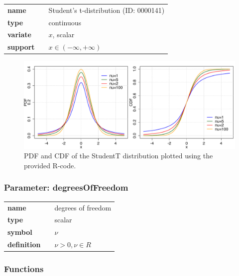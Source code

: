 \begin{tabular}{p{2cm}cl}
\textbf{name} & & Student's t-distribution (ID: 0000141)\\ 
 
\textbf{type} & & continuous \\ 

\textbf{variate} & & $x$, scalar \\ 

\textbf{support} & & $x \in (-\infty,+\infty)$
\end{tabular}
\begin{figure}[htb!]
\centering
  \includegraphics[width=140mm]{pics/StudentT_pdf_cdf.pdf}
 \caption{PDF and CDF of the StudentT distribution plotted using the provided R-code.}
 \label{fig:StudentTpdfcdf}
\end{figure}
\subsubsection*{Parameter: degreesOfFreedom}

\noindent\begin{tabular}{p{2cm}cl}
\textbf{name} & & degrees of freedom \\
\textbf{type} & & scalar \\
\textbf{symbol} & & $\nu$  \\
\textbf{definition} & & $\nu > 0, \nu \in  R$
\end{tabular}
\subsubsection*{Functions}

